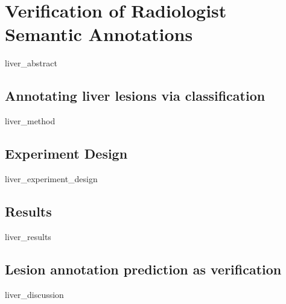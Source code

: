\chapter{Verification of Radiologist Semantic Annotations}
{liver_abstract}
\clearpage

\section{Annotating liver lesions via classification}
{liver_method}
\clearpage

\section{Experiment Design}
{liver_experiment_design}
\clearpage

\section{Results}
{liver_results}
\clearpage

\section{Lesion annotation prediction as verification}
{liver_discussion}
\clearpage